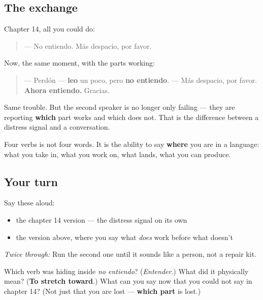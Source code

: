 \subsection*{The exchange}
Chapter 14, all you could do:

\begin{quote}
— No entiendo. Más despacio, por favor.
\end{quote}

Now, the same moment, with the parts working:

\begin{quote}
— Perdón — \textbf{leo} un poco, pero \textbf{no entiendo}. — Más despacio, por favor. \textbf{Ahora entiendo.} Gracias.
\end{quote}

Same trouble. But the second speaker is no longer only failing — they are reporting \textbf{which} part works and which does not. That is the difference between a distress signal and a conversation.

\begin{grammarlens}[title={What you've built}]
Four verbs is not four words. It is the ability to say \textbf{where} you are in a language: what you take in, what you work on, what lands, what you can produce.
\end{grammarlens}

\subsection*{Your turn}
Say these aloud:

\begin{itemize}
\raggedright
  \item the chapter 14 version — the distress signal on its own
  \item the version above, where you say what \emph{does} work before what doesn't
\end{itemize}

\emph{Twice through:} Run the second one until it sounds like a person, not a repair kit.

\begin{tcolorbox}[breakable,colback=teal!4,colframe=teal!35!black,title={Before you move on}]
Which verb was hiding inside \emph{no entiendo}? (\emph{Entender}.) What did it physically mean? (\textbf{To stretch toward}.) What can you say now that you could not say in chapter 14? (Not just that you are lost — \textbf{which part} is lost.)
\end{tcolorbox}

